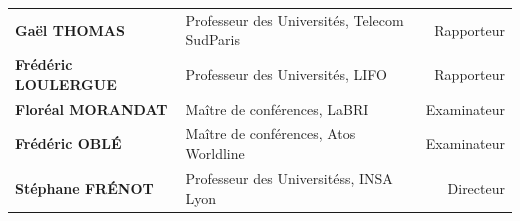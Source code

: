 \begin{center}
\begin{tabu} {l X[l] r}
\textbf{Gaël \MakeUppercase{Thomas}}         & Professeur des Universités, Telecom SudParis & Rapporteur\\
\textbf{Frédéric \MakeUppercase{Loulergue}~} & Professeur des Universités, LIFO             & Rapporteur\\
\textbf{Floréal \MakeUppercase{Morandat}}    & Maître de conférences, LaBRI                 & Examinateur\\
\textbf{Frédéric \MakeUppercase{Oblé}}       & Maître de conférences, Atos Worldline        & Examinateur\\
\textbf{Stéphane \MakeUppercase{Frénot}}     & Professeur des Universitéss, INSA Lyon       & Directeur\\
\end{tabu}
\end{center}
\restoregeometry
\eject
